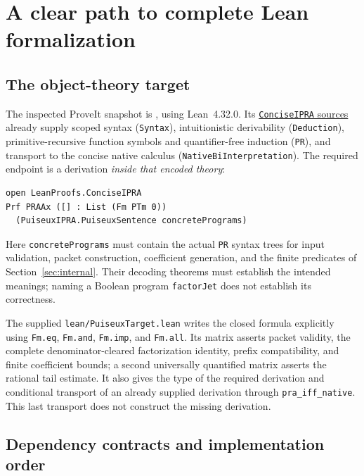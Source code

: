 \section{A clear path to complete Lean formalization}\label{sec:lean}

\subsection{The object-theory target}

The inspected ProveIt snapshot is \texttt{\pin}, using Lean~4.32.0.
Its \href{https://github.com/VladimirReshetnikov/ProveIt/tree/d851229c33ef395db8dc04baf28c6a291073f61e/Logic/PrimitiveRecursiveArithmetic/ConciseIPRA/Lean/ConciseIPRA}{\texttt{ConciseIPRA} sources}
already supply scoped syntax (\texttt{Syntax}), intuitionistic derivability
(\texttt{Deduction}), primitive-recursive function symbols and
quantifier-free induction (\texttt{PR}), and transport to the concise
native calculus (\texttt{NativeBiInterpretation}).
The required endpoint is a derivation \emph{inside that encoded theory}:
\begin{lstlisting}
open LeanProofs.ConciseIPRA
Prf PRAAx ([] : List (Fm PTm 0))
  (PuiseuxIPRA.PuiseuxSentence concretePrograms)
\end{lstlisting}
Here \texttt{concretePrograms} must contain the actual \texttt{PR} syntax
trees for input validation, packet construction, coefficient generation,
and the finite predicates of Section~\ref{sec:internal}.  Their decoding
theorems must establish the intended meanings; naming a Boolean program
\texttt{factorJet} does not establish its correctness.

The supplied \texttt{lean/PuiseuxTarget.lean} writes the closed formula
explicitly using \texttt{Fm.eq}, \texttt{Fm.and}, \texttt{Fm.imp}, and
\texttt{Fm.all}.  Its matrix asserts packet validity, the complete
denominator-cleared factorization identity, prefix compatibility, and
finite coefficient bounds; a second universally quantified matrix asserts
the rational tail estimate.  It also gives the type of the required
derivation and conditional transport of an already supplied derivation
through \texttt{pra\_iff\_native}.  This last transport does not construct
the missing derivation.

\subsection{Dependency contracts and implementation order}

